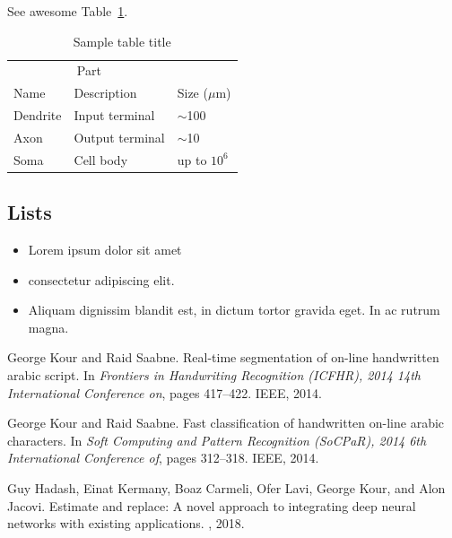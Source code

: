 \documentclass{article}
\begin{document}
See awesome Table~\ref{tab:table}.

\begin{table}
 \caption{Sample table title}
  \centering
  \begin{tabular}{lll}
    \toprule
    \multicolumn{2}{c}{Part}                   \\
    \cmidrule(r){1-2}
    Name     & Description     & Size ($\mu$m) \\
    \midrule
    Dendrite & Input terminal  & $\sim$100     \\
    Axon     & Output terminal & $\sim$10      \\
    Soma     & Cell body       & up to $10^6$  \\
    \bottomrule
  \end{tabular}
  \label{tab:table}
\end{table}

\subsection{Lists}
\begin{itemize}
\item Lorem ipsum dolor sit amet
\item consectetur adipiscing elit. 
\item Aliquam dignissim blandit est, in dictum tortor gravida eget. In ac rutrum magna.
\end{itemize}


  


\begin{thebibliography}{1}

George Kour and Raid Saabne.
\newblock Real-time segmentation of on-line handwritten arabic script.
\newblock In {\em Frontiers in Handwriting Recognition (ICFHR), 2014 14th
  International Conference on}, pages 417--422. IEEE, 2014.

George Kour and Raid Saabne.
\newblock Fast classification of handwritten on-line arabic characters.
\newblock In {\em Soft Computing and Pattern Recognition (SoCPaR), 2014 6th
  International Conference of}, pages 312--318. IEEE, 2014.

Guy Hadash, Einat Kermany, Boaz Carmeli, Ofer Lavi, George Kour, and Alon
  Jacovi.
\newblock Estimate and replace: A novel approach to integrating deep neural
  networks with existing applications.
, 2018.

\end{thebibliography}
\end{document}
